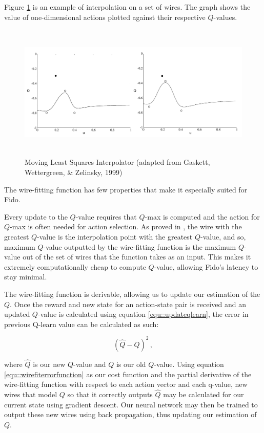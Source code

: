 Figure \ref{fig::wirefitexample} is an example of interpolation on a set of wires. The graph shows the value of one-dimensional actions plotted against their respective $Q$-values.

\begin{figure}[ht]
    \centering
    \includegraphics[height=6.5cm]{Figures/WireFit.png}
	\caption{Moving Least Squares Interpolator (adapted from Gaskett, Wettergreen, \& Zelinsky, 1999)}
    \label{fig::wirefitexample}
\end{figure}

The wire-fitting function has few properties that make it especially suited for Fido.

Every update to the $Q$-value requires that $Q$-max is computed and the action for $Q$-max is often needed for action selection. As proved in \cite{baird}, the wire with the greatest $Q$-value is the interpolation point with the greatest $Q$-value, and so, maximum $Q$-value outputted by the wire-fitting function is the maximum $Q$-value out of the set of wires that the function takes as an input. This makes it extremely computationally cheap to compute $Q$-value, allowing Fido's latency to stay minimal.

The wire-fitting function is derivable, allowing us to update our estimation of the $Q$. Once the reward and new state for an action-state pair is received and an updated $Q$-value is calculated using equation \ref{equ::updateqlearn}, the error in previous Q-learn value can be calculated as such:

\begin{equation}
	(\hat{Q} - Q)^2
	\,,
	\label{equ::wirefiterrorfunction}
\end{equation}

\noindent
where $\hat{Q}$ is our new $Q$-value and $Q$ is our old $Q$-value. Using equation \ref{equ::wirefiterrorfunction} as our cost function and the partial derivative of the wire-fitting function with respect to each action vector and each q-value, new wires that model $Q$ so that it correctly outputs $\hat{Q}$ may be calculated for our current state using gradient descent. Our neural network may then be trained to output these new wires using back propagation, thus updating our estimation of $Q$.

